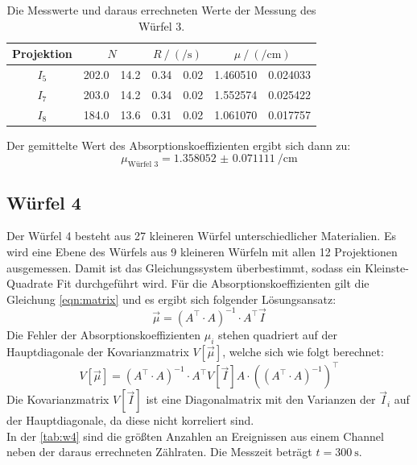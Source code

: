   \begin{table}[H]
    \centering
    \caption{Die Messwerte und daraus errechneten Werte der Messung des Würfel 3.}
    \label{tab:w3}
    \begin{tabular}{c S[table-format=3.1] @{${}\pm{}$} S[table-format=2.1] S[table-format=2.2] @{${}\pm{}$} S[table-format=1.2] S[table-format=1.6] @{${}\pm{}$} S[table-format=1.6]}
      \toprule
      {Projektion} &  &  &  \\
      \midrule
      $I_5$& 202.0 & 14.2 & 0.34 & 0.02 & 1.460510 & 0.024033 \\
      $I_7$& 203.0 & 14.2 & 0.34 & 0.02 & 1.552574 & 0.025422 \\
      $I_8$& 184.0 & 13.6 & 0.31 & 0.02 & 1.061070 & 0.017757 \\
      \bottomrule  
    \end{tabular}
  \end{table}

  \noindent Der gemittelte Wert des Absorptionskoeffizienten ergibt sich dann zu:
  \begin{equation*}
    \mu_{\text{Würfel 3}} = \SI{1.358052(71111)}{\per\centi\meter}
  \end{equation*}

\subsection{Würfel 4}

  \noindent Der Würfel 4 besteht aus 27 kleineren Würfel unterschiedlicher Materialien. Es wird eine Ebene des Würfels aus 9 kleineren Würfeln mit 
  allen 12 Projektionen ausgemessen. Damit ist das Gleichungssystem überbestimmt, sodass ein Kleinste-Quadrate Fit durchgeführt wird. Für die 
  Absorptionskoeffizienten gilt die Gleichung \eqref{eqn:matrix} und es ergibt sich folgender Lösungsansatz:
  \begin{equation*}
    \vec{\mu} = \left( A^\top \cdot A \right)^{-1} \cdot A^\top \vec{I}
  \end{equation*}
  Die Fehler der Absorptionskoeffizienten $\mu_i$ stehen quadriert auf der Hauptdiagonale der Kovarianzmatrix $V[\vec{\mu}]$, welche sich wie folgt berechnet:
  \begin{equation*}
    V[\vec{\mu}] = \left( A^\top \cdot A \right)^{-1} \cdot A^\top V[\vec{I}] A \cdot \left( \left(A^\top \cdot A\right)^{-1} \right)^\top
  \end{equation*}
  Die Kovarianzmatrix $V[\vec{I}]$ ist eine Diagonalmatrix mit den Varianzen der $\vec{I}_i$ auf der Hauptdiagonale, da diese nicht korreliert sind.\\ 
  In der \autoref{tab:w4} sind die größten Anzahlen an Ereignissen aus einem Channel neben der daraus errechneten Zählraten.
  Die Messzeit beträgt $t =  \SI{300}{\second}$. 

